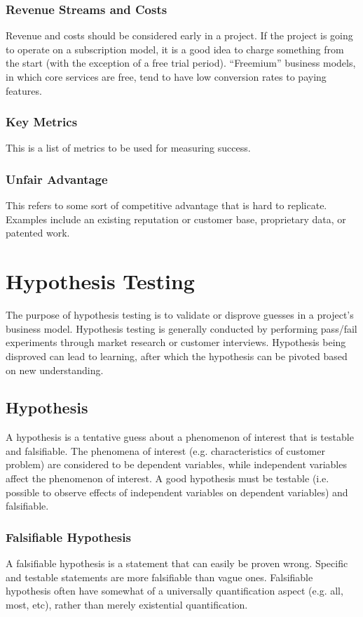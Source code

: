\documentclass[12pt,titlepage]{article}
\let\stdsection\section
\renewcommand\section{\clearpage\stdsection}
\begin{document}
      \subsubsection{Revenue Streams and Costs}
        Revenue and costs should be considered early in a project. If the project is going to operate on a subscription model, it is
        a good idea to charge something from the start (with the exception of a free trial period). ``Freemium'' business models, in
        which core services are free, tend to have low conversion rates to paying features.

      \subsubsection{Key Metrics}
        This is a list of metrics to be used for measuring success.

      \subsubsection{Unfair Advantage}
        This refers to some sort of competitive advantage that is hard to replicate. Examples include an existing reputation or customer
        base, proprietary data, or patented work.

  \section{Hypothesis Testing}
    The purpose of hypothesis testing is to validate or disprove guesses in a project's business model. Hypothesis testing is generally
    conducted by performing pass/fail experiments through market research or customer interviews. Hypothesis being disproved can lead
    to learning, after which the hypothesis can be pivoted based on new understanding.

    \subsection{Hypothesis}
      A hypothesis is a tentative guess about a phenomenon of interest that is testable and falsifiable. The phenomena of interest
      (e.g. characteristics of customer problem) are considered to be dependent variables, while independent variables affect the
      phenomenon of interest. A good hypothesis must be testable (i.e. possible to observe effects of independent variables on
      dependent variables) and falsifiable.

      \subsubsection{Falsifiable Hypothesis}
        A falsifiable hypothesis is a statement that can easily be proven wrong. Specific and testable statements are more falsifiable
        than vague ones. Falsifiable hypothesis often have somewhat of a universally quantification aspect (e.g. all, most, etc), rather
        than merely existential quantification.
\end{document}
